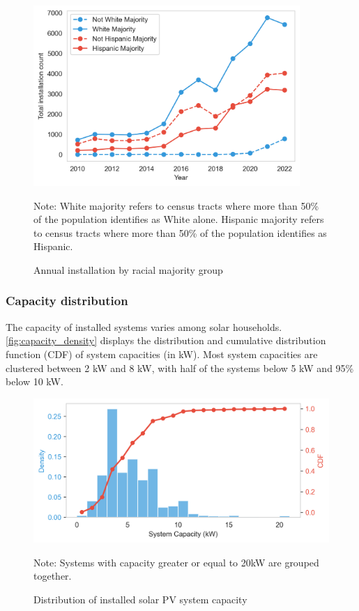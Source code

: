 \documentclass[11pt,twoside,letterpaper]{article}
\begin{document}
\begin{figure}[!ht]
    \centering
\includegraphics[width=0.9\textwidth]{figures/installation_by_race.png}
    \caption{Annual installation by racial majority group}
    \label{fig:installation_race}
        \begin{flushleft}
        \footnotesize Note: White majority refers to census tracts where more than 50\% of the population identifies as White alone. Hispanic majority refers to census tracts where more than 50\% of the population identifies as Hispanic.
    \end{flushleft}
\end{figure}



\subsubsection{Capacity distribution}

The capacity of installed systems varies among solar households. \autoref{fig:capacity_density} displays the distribution and cumulative distribution function (CDF) of system capacities (in kW). Most system capacities are clustered between 2 kW and 8 kW, with half of the systems below 5 kW and 95\% below 10 kW.


\begin{figure}[!ht]
    \centering
\includegraphics[width=1\textwidth]{figures/capacity_density_cdf.png}
    \caption{Distribution  of installed solar PV system capacity}
    \label{fig:capacity_density}
        \begin{flushleft}
        \footnotesize Note: Systems with capacity greater or equal to 20kW are grouped together. 
    \end{flushleft}
\end{figure}
\end{document}
